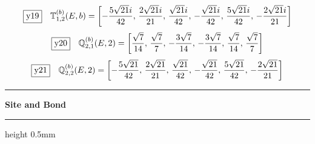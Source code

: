 \documentclass[fleqn,10pt,landscape]{jsarticle}
\begin{document}
\begin{dmath*}
\fbox{y19}\quad \mathbb{T}_{1,2}^{(b)}(E,b)=\left[ - \frac{5 \sqrt{21} i}{42},\, \frac{2 \sqrt{21} i}{21},\, \frac{\sqrt{21} i}{42},\, - \frac{\sqrt{21} i}{42},\, \frac{5 \sqrt{21} i}{42},\, - \frac{2 \sqrt{21} i}{21} \right]
\end{dmath*}
\begin{dmath*}
\fbox{y20}\quad \mathbb{Q}_{2,1}^{(b)}(E,2)=\left[ \frac{\sqrt{7}}{14},\, \frac{\sqrt{7}}{7},\, - \frac{3 \sqrt{7}}{14},\, - \frac{3 \sqrt{7}}{14},\, \frac{\sqrt{7}}{14},\, \frac{\sqrt{7}}{7} \right]
\end{dmath*}
\begin{dmath*}
\fbox{y21}\quad \mathbb{Q}_{2,2}^{(b)}(E,2)=\left[ - \frac{5 \sqrt{21}}{42},\, \frac{2 \sqrt{21}}{21},\, \frac{\sqrt{21}}{42},\, - \frac{\sqrt{21}}{42},\, \frac{5 \sqrt{21}}{42},\, - \frac{2 \sqrt{21}}{21} \right]
\end{dmath*}
\vspace{5mm}
\noindent \rule[0.5mm]{5mm}{0.5mm}\hspace{3mm}\textbf{Site and Bond}\hspace{3mm}\leaders\hrule height 0.5mm\hfill\kern0pt
\vspace{3mm}
\end{document}
